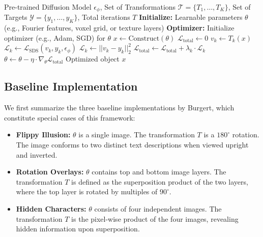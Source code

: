 \documentclass{article}
\begin{document}
\begin{algorithm}[t]
\caption{Unified Framework for Diffusion-Based Visual Illusions}
\label{alg:framework}
\begin{algorithmic}[1]
\REQUIRE Pre-trained Diffusion Model $\epsilon_\phi$, Set of Transformations $\mathcal{T} = \{T_1, \dots, T_K\}$, Set of Targets $\mathcal{Y} = \{y_1, \dots, y_K\}$, Total iterations $T$
\STATE \textbf{Initialize:} Learnable parameters $\theta$ (e.g., Fourier features, voxel grid, or texture layers)
\STATE \textbf{Optimizer:} Initialize optimizer (e.g., Adam, SGD) for $\theta$
    \STATE $x \leftarrow \text{Construct}(\theta)$ 
    \STATE $\mathcal{L}_{\text{total}} \leftarrow 0$
        \STATE $v_k \leftarrow T_k(x)$ 
            \STATE $\mathcal{L}_k \leftarrow \mathcal{L}_{\text{SDS}}(v_k, y_k, \epsilon_\phi)$ 
            \STATE $\mathcal{L}_k \leftarrow ||v_k - y_k||^2_2$ 
        \ENDIF
        \STATE $\mathcal{L}_{\text{total}} \leftarrow \mathcal{L}_{\text{total}} + \lambda_k \cdot \mathcal{L}_k$
    \ENDFOR
    \STATE $\theta \leftarrow \theta - \eta \cdot \nabla_\theta \mathcal{L}_{\text{total}}$ 
\ENDFOR
\RETURN Optimized object $x$
\end{algorithmic}
\end{algorithm}

\subsection{Baseline Implementation}
We first summarize the three baseline implementations by Burgert\cite{10.1145/3641519.3657500}, which constitute special cases of this framework:

\begin{itemize}
    \item \textbf{Flippy Illusion:} $\theta$ is a single image. The transformation $T$ is a $180^\circ$ rotation. The image conforms to two distinct text descriptions when viewed upright and inverted.
    \item \textbf{Rotation Overlays:} $\theta$ contains top and bottom image layers. The transformation $T$ is defined as the superposition product of the two layers, where the top layer is rotated by multiples of $90^\circ$.
    \item \textbf{Hidden Characters:} $\theta$ consists of four independent images. The transformation $T$ is the pixel-wise product of the four images, revealing hidden information upon superposition.
\end{itemize}
\end{document}
